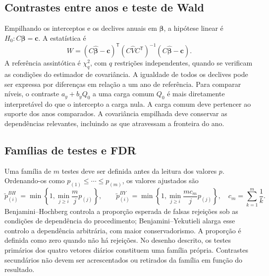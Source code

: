 \subsection{Contrastes entre anos e teste de Wald}
\label{sec:mat-wald}
Empilhando os interceptos e os declives anuais em $\widehat{\boldsymbol\beta}$, a hipótese linear é $H_0:C\boldsymbol\beta=\boldsymbol c$. A estatística é
\begin{equation}
W=(C\widehat{\boldsymbol\beta}-\boldsymbol c)^{\mathsf T}
(C\widehat V C^{\mathsf T})^{-1}
(C\widehat{\boldsymbol\beta}-\boldsymbol c).
\label{eq:mat-wald}
\end{equation}
A referência assintótica é $\chi^2_q$, com $q$ restrições independentes, quando se verificam as condições do estimador de covariância. A igualdade de todos os declives pode ser expressa por diferenças em relação a um ano de referência. Para comparar níveis, o contraste $a_y+b_yQ_0$ a uma carga comum $Q_0$ é mais diretamente interpretável do que o intercepto a carga nula. A carga comum deve pertencer ao suporte dos anos comparados. A covariância empilhada deve conservar as dependências relevantes, incluindo as que atravessam a fronteira do ano.

\subsection{Famílias de testes e FDR}
\label{sec:mat-fdr}
Uma família de $m$ testes deve ser definida antes da leitura dos valores $p$. Ordenando-os como $p_{(1)}\leq\cdots\leq p_{(m)}$, os valores ajustados são
\begin{equation}
\widetilde p_{(i)}^{BH}=\min\left\{1,\min_{j\geq i}\frac{m}{j}p_{(j)}\right\},
\qquad
\widetilde p_{(i)}^{BY}=\min\left\{1,\min_{j\geq i}\frac{mc_m}{j}p_{(j)}\right\},
\quad c_m=\sum_{k=1}^m\frac1k.
\label{eq:mat-fdr}
\end{equation}
Benjamini--Hochberg controla a proporção esperada de falsas rejeições sob as condições de dependência do procedimento; Benjamini--Yekutieli alarga esse controlo a dependência arbitrária, com maior conservadorismo\parencite{BenjaminiHochberg1995,BenjaminiYekutieli2001}. A proporção é definida como zero quando não há rejeições. No desenho descrito, os testes primários dos quatro vetores diários constituem uma família própria. Contrastes secundários não devem ser acrescentados ou retirados da família em função do resultado.

